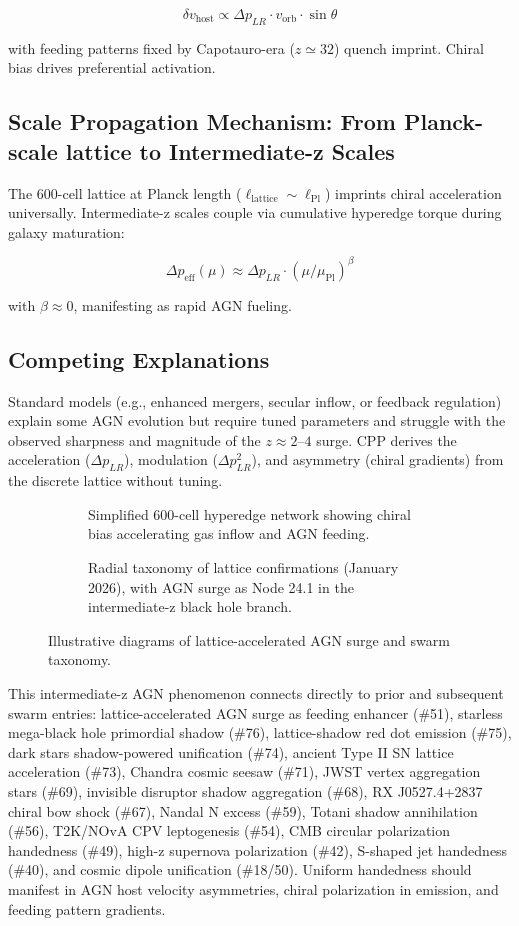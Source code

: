 \documentclass[11pt]{article}
\begin{document}
\[
\delta v_{\text{host}} \propto \Delta p_{LR} \cdot v_{\text{orb}} \cdot \sin\theta
\]

with feeding patterns fixed by Capotauro-era ($z \simeq 32$) quench imprint. Chiral bias drives preferential activation.

\subsection{Scale Propagation Mechanism: From Planck-scale lattice to Intermediate-z Scales}
The 600-cell lattice at Planck length ($\ell_{\text{lattice}} \sim \ell_{\text{Pl}}$) imprints chiral acceleration universally. Intermediate-z scales couple via cumulative hyperedge torque during galaxy maturation:

\[
\Delta p_{\text{eff}}(\mu) \approx \Delta p_{LR} \cdot (\mu / \mu_{\text{Pl}})^\beta
\]

with $\beta \approx 0$, manifesting as rapid AGN fueling.

\subsection{Competing Explanations}
Standard models (e.g., enhanced mergers, secular inflow, or feedback regulation) explain some AGN evolution but require tuned parameters and struggle with the observed sharpness and magnitude of the $z \approx 2$--$4$ surge. CPP derives the acceleration ($\Delta p_{LR}$), modulation ($\Delta p_{LR}^2$), and asymmetry (chiral gradients) from the discrete lattice without tuning.

\begin{figure}[htbp]
\centering
\begin{subfigure}{0.45\textwidth}
\centering
\caption{Simplified 600-cell hyperedge network showing chiral bias accelerating gas inflow and AGN feeding.}
\label{fig:lattice-agn}
\end{subfigure}
\hfill
\begin{subfigure}{0.45\textwidth}
\centering
\caption{Radial taxonomy of lattice confirmations (January 2026), with AGN surge as Node 24.1 in the intermediate-z black hole branch.}
\label{fig:taxonomy}
\end{subfigure}
\caption{Illustrative diagrams of lattice-accelerated AGN surge and swarm taxonomy.}
\end{figure}

This intermediate-z AGN phenomenon connects directly to prior and subsequent swarm entries: lattice-accelerated AGN surge as feeding enhancer (\#51), starless mega-black hole primordial shadow (\#76), lattice-shadow red dot emission (\#75), dark stars shadow-powered unification (\#74), ancient Type II SN lattice acceleration (\#73), Chandra cosmic seesaw (\#71), JWST vertex aggregation stars (\#69), invisible disruptor shadow aggregation (\#68), RX J0527.4+2837 chiral bow shock (\#67), Nandal N excess (\#59), Totani shadow annihilation (\#56), T2K/NOvA CPV leptogenesis (\#54), CMB circular polarization handedness (\#49), high-z supernova polarization (\#42), S-shaped jet handedness (\#40), and cosmic dipole unification (\#18/50). Uniform handedness should manifest in AGN host velocity asymmetries, chiral polarization in emission, and feeding pattern gradients.
\end{document}

